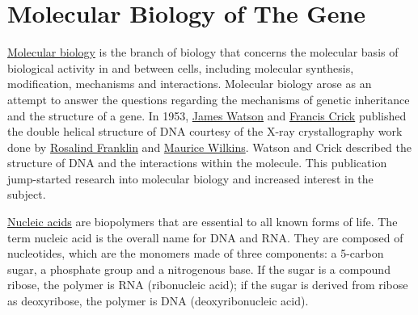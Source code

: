 \hypertarget{molecular-biology-of-the-gene}{%
\chapter{Molecular Biology of The Gene}\label{molecular-biology-of-the-gene}}

\href{https://en.wikipedia.org/wiki/Molecular_biology}{Molecular biology} is the branch of biology that concerns the molecular basis of biological activity in and between cells, including molecular synthesis, modification, mechanisms and interactions. Molecular biology arose as an attempt to answer the questions regarding the mechanisms of genetic inheritance and the structure of a gene. In 1953, \href{https://en.wikipedia.org/wiki/James_Watson}{James Watson} and \href{https://en.wikipedia.org/wiki/Francis_Crick}{Francis Crick} published the double helical structure of DNA courtesy of the X-ray crystallography work done by \href{https://en.wikipedia.org/wiki/Rosalind_Franklin}{Rosalind Franklin} and \href{https://en.wikipedia.org/wiki/Maurice_Wilkins}{Maurice Wilkins}. Watson and Crick described the structure of DNA and the interactions within the molecule. This publication jump-started research into molecular biology and increased interest in the subject.

\href{https://en.wikipedia.org/wiki/Nucleic_acid}{Nucleic acids} are biopolymers that are essential to all known forms of life. The term nucleic acid is the overall name for DNA and RNA. They are composed of nucleotides, which are the monomers made of three components: a 5-carbon sugar, a phosphate group and a nitrogenous base. If the sugar is a compound ribose, the polymer is RNA (ribonucleic acid); if the sugar is derived from ribose as deoxyribose, the polymer is DNA (deoxyribonucleic acid).

